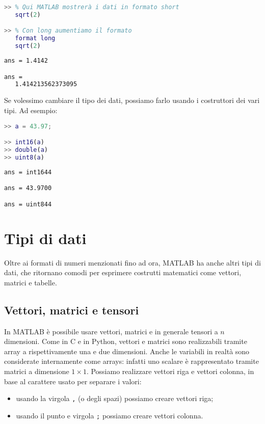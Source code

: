 \begin{terminal}
    \begin{lstlisting}[language=MATLAB, style=notexterm]
>> % Qui MATLAB mostrerà i dati in formato short
   sqrt(2)

>> % Con long aumentiamo il formato
   format long
   sqrt(2)\end{lstlisting}
    \tcblower
    \begin{lstlisting}[style=notexterm, language = tex]
ans = 1.4142

ans = 
   1.414213562373095\end{lstlisting}
\end{terminal}

Se volessimo cambiare il tipo dei dati, possiamo farlo usando i costruttori dei vari tipi. Ad esempio:

\begin{terminal}
    \begin{lstlisting}[language=MATLAB, style=notexterm]
>> a = 43.97;

>> int16(a)
>> double(a)
>> uint8(a)\end{lstlisting}
    \tcblower
    \begin{lstlisting}[style=notexterm, language = tex]
ans = int1644

ans = 43.9700

ans = uint844\end{lstlisting}
\end{terminal}

\section{Tipi di dati}

Oltre ai formati di numeri menzionati fino ad ora, MATLAB ha anche altri tipi di dati, che ritornano comodi per esprimere costrutti matematici come vettori, matrici e tabelle.

\subsection{Vettori, matrici e tensori}

In MATLAB è possibile usare vettori, matrici e in generale tensori a $n$ dimensioni. Come in C e in Python, vettori e matrici sono realizzabili tramite array a rispettivamente una e due dimensioni. Anche le variabili in realtà sono considerate internamente come arrays: infatti uno scalare è rappresentato tramite matrici a dimensione $1\times 1$. Possiamo realizzare vettori riga e vettori colonna, in base al carattere usato per separare i valori:
\begin{itemize}
    \item usando la virgola \texttt{,} (o degli spazi) possiamo creare vettori riga;
    \item usando il punto e virgola \texttt{;} possiamo creare vettori colonna.
\end{itemize}


